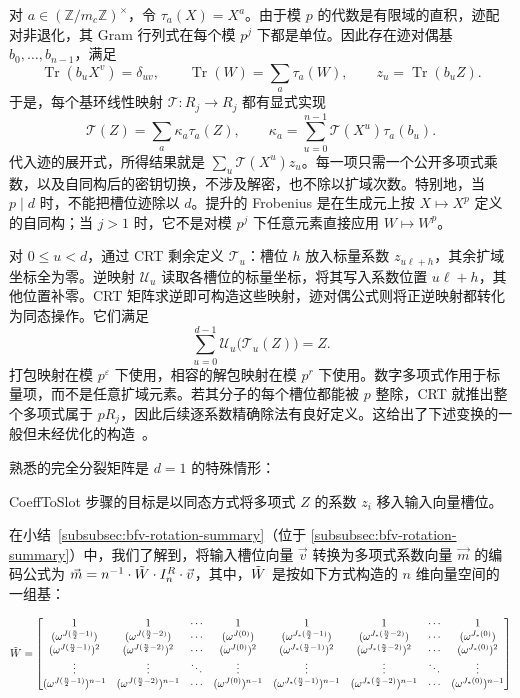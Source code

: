 对 $a\in(\mathbb Z/m_c\mathbb Z)^\times$，令 $\tau_a(X)=X^a$。由于模 $p$ 的代数是有限域的直积，迹配对非退化，其 Gram 行列式在每个模 $p^j$ 下都是单位。因此存在迹对偶基 $b_0,\ldots,b_{n-1}$，满足
\[
\operatorname{Tr}(b_uX^v)=\delta_{uv},\qquad
\operatorname{Tr}(W)=\sum_a\tau_a(W),\qquad
z_u=\operatorname{Tr}(b_uZ).
\]
于是，每个基环线性映射 $\mathcal T:R_j\to R_j$ 都有显式实现
\[
\mathcal T(Z)=\sum_a\kappa_a\tau_a(Z),\qquad
\kappa_a=\sum_{u=0}^{n-1}\mathcal T(X^u)\tau_a(b_u).
\]
代入迹的展开式，所得结果就是 $\sum_u\mathcal T(X^u)z_u$。每一项只需一个公开多项式乘数，以及自同构后的密钥切换，不涉及解密，也不除以扩域次数。特别地，当 $p\mid d$ 时，不能把槽位迹除以 $d$。提升的 Frobenius 是在生成元上按 $X\mapsto X^p$ 定义的自同构；当 $j>1$ 时，它不是对模 $p^j$ 下任意元素直接应用 $W\mapsto W^p$。

对 $0\leq u<d$，通过 CRT 剩余定义 $\mathcal T_u$：槽位 $h$ 放入标量系数 $z_{u\ell+h}$，其余扩域坐标全为零。逆映射 $\mathcal U_u$ 读取各槽位的标量坐标，将其写入系数位置 $u\ell+h$，其他位置补零。CRT 矩阵求逆即可构造这些映射，迹对偶公式则将正逆映射都转化为同态操作。它们满足
\[
\sum_{u=0}^{d-1}\mathcal U_u\bigl(\mathcal T_u(Z)\bigr)=Z.
\]
打包映射在模 $p^\varepsilon$ 下使用，相容的解包映射在模 $p^r$ 下使用。数字多项式作用于标量项，而不是任意扩域元素。若其分子的每个槽位都能被 $p$ 整除，CRT 就推出整个多项式属于 $pR_j$，因此后续逐系数精确除法有良好定义。这给出了下述变换的一般但未经优化的构造~\cite{cryptoeprint:2022/1363}。

熟悉的完全分裂矩阵是 $d=1$ 的特殊情形：

\textsf{CoeffToSlot} 步骤的目标是以同态方式将多项式 $Z$ 的系数 $z_i$ 移入输入向量槽位。


在小结~\ref*{subsubsec:bfv-rotation-summary}（位于 \autoref{subsubsec:bfv-rotation-summary}）中，我们了解到，将输入槽位向量 $\vec{v}$ 转换为多项式系数向量 $\vec{m}$ 的编码公式为 $\vec{m} = n^{-1}\cdot\tilde{W} \cdot I_n^R \cdot \vec{v}$，其中，$\tilde{W}$ 是按如下方式构造的 $n$ 维向量空间的一组基：

$\tilde{W} = \begin{bmatrix}
1 & 1 & \cdots & 1 & 1 & 1 & \cdots & 1\\
(\omega^{J(\frac{n}{2} - 1)}) & (\omega^{J(\frac{n}{2} - 2)}) & \cdots & (\omega^{J(0)}) & (\omega^{J_*(\frac{n}{2} - 1)}) & (\omega^{J_*(\frac{n}{2} - 2)}) & \cdots & (\omega^{J_*(0)})\\
(\omega^{J(\frac{n}{2} - 1)})^2 & (\omega^{J(\frac{n}{2} - 2)})^2 & \cdots & (\omega^{J(0)})^2 & (\omega^{J_*(\frac{n}{2} - 1)})^2 & (\omega^{J_*(\frac{n}{2} - 2)})^2 & \cdots & (\omega^{J_*(0)})^2 \\
\vdots & \vdots & \ddots & \vdots & \vdots & \vdots & \ddots & \vdots \\
(\omega^{J(\frac{n}{2} - 1)})^{n-1} & (\omega^{J(\frac{n}{2} - 2)})^{n-1} & \cdots & (\omega^{J(0)})^{n-1} & (\omega^{J_*(\frac{n}{2} - 1)})^{n-1} & (\omega^{J_*(\frac{n}{2} - 2)})^{n-1} & \cdots  & (\omega^{J_*(0)})^{n-1}
\end{bmatrix}$

